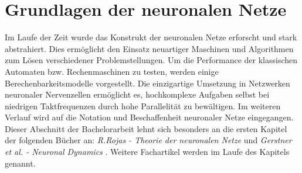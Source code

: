%
\chapter{Grundlagen der neuronalen Netze}
\label{chap:neuro}
%
	Im Laufe der Zeit wurde das Konstrukt der neuronalen Netze erforscht und stark abstrahiert. Dies ermöglicht den Einsatz neuartiger Maschinen und Algorithmen zum Lösen verschiedener Problemstellungen. Um die Performance der klassischen Automaten bzw. Rechenmaschinen zu testen, werden einige Berechenbarkeitsmodelle vorgestellt. Die einzigartige Umsetzung in Netzwerken neuronaler Nervenzellen ermöglicht es, hochkomplexe Aufgaben selbst bei niedrigen Taktfrequenzen durch hohe Parallelität zu bewältigen. Im weiteren Verlauf wird auf die Notation und Beschaffenheit neuronaler Netze eingegangen.\\
	Dieser Abschnitt der Bachelorarbeit lehnt sich besonders an die ersten Kapitel der folgenden Bücher an: \textit{R.Rojas - Theorie der neuronalen Netze} \cite{TheorieNeuro} und \textit{Gerstner et al. - Neuronal Dynamics} \cite{NeuronalDynamics}. Weitere Fachartikel werden im Laufe des Kapitels genannt.
